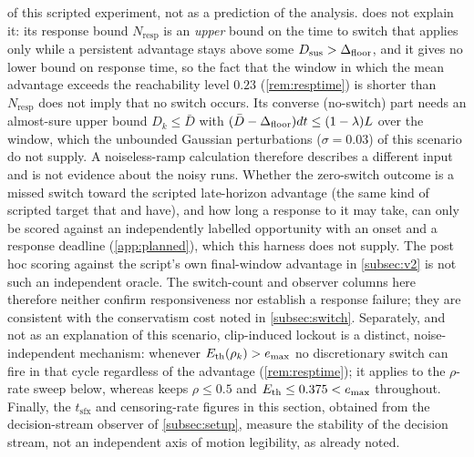 of this scripted experiment, not as a prediction of the analysis.  does not explain it: its response bound $N_{\text{resp}}$ is an \emph{upper} bound on the time to switch that applies only while a persistent advantage stays above some $D_{\text{sus}}>\Delta_{\text{floor}}$, and it gives no lower bound on response time, so the fact that the window in which the mean advantage exceeds the reachability level $0.23$ (\cref{rem:resptime}) is shorter than $N_{\text{resp}}$ does not imply that no switch occurs. Its converse (no-switch) part needs an almost-sure upper bound $D_k\le\bar D$ with $(\bar D-\Delta_{\text{floor}})dt\le(1-\lambda)L$ over the window, which the unbounded Gaussian perturbations ($\sigma=0.03$) of this scenario do not supply. A noiseless-ramp calculation therefore describes a different input and is not evidence about the noisy runs. Whether the zero-switch outcome is a missed switch toward the scripted late-horizon advantage (the same kind of scripted target that  and  have), and how long a response to it may take, can only be scored against an independently labelled opportunity with an onset and a response deadline (\cref{app:planned}), which this harness does not supply. The post hoc scoring against the script's own final-window advantage in \cref{subsec:v2} is not such an independent oracle. The switch-count and observer columns here therefore neither confirm responsiveness nor establish a response failure; they are consistent with the conservatism cost noted in \cref{subsec:switch}. Separately, and not as an explanation of this scenario, clip-induced lockout is a distinct, noise-independent mechanism: whenever $E_{\text{th}}(\rho_k)>e_{\max}$ no discretionary switch can fire in that cycle regardless of the advantage (\cref{rem:resptime}); it applies to the $\rho$-rate sweep below, whereas  keeps $\rho\le0.5$ and $E_{\text{th}}\le0.375<e_{\max}$ throughout. Finally, the $t_{\text{sfx}}$ and censoring-rate figures in this section, obtained from the decision-stream observer of \cref{subsec:setup}, measure the stability of the decision stream, not an independent axis of motion legibility, as already noted.

